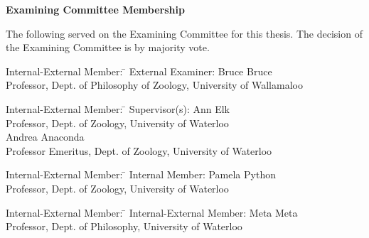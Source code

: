 \documentclass[letterpaper,12pt,titlepage,oneside,final]{book}
\let\origdoublepage\cleardoublepage
\newcommand{\clearemptydoublepage}{%
  \clearpage{\pagestyle{empty}\origdoublepage}}
\let\cleardoublepage\clearemptydoublepage
\begin{document}
\pagestyle{plain}
\setcounter{page}{2}

\cleardoublepage %
 
\begin{center}\textbf{Examining Committee Membership}\end{center}
  \noindent
The following served on the Examining Committee for this thesis. The decision of the Examining Committee is by majority vote.
  \bigskip
  
  \noindent
\begin{tabbing}
Internal-External Member: \=  \kill %
External Examiner: \>  Bruce Bruce \\ 
\> Professor, Dept. of Philosophy of Zoology, University of Wallamaloo \\
\end{tabbing} 
  \bigskip
  
  \noindent
\begin{tabbing}
Internal-External Member: \=  \kill %
Supervisor(s): \> Ann Elk \\
\> Professor, Dept. of Zoology, University of Waterloo \\
\> Andrea Anaconda \\
\> Professor Emeritus, Dept. of Zoology, University of Waterloo \\
\end{tabbing}
  \bigskip
  
  \noindent
  \begin{tabbing}
Internal-External Member: \=  \kill %
Internal Member: \> Pamela Python \\
\> Professor, Dept. of Zoology, University of Waterloo \\
\end{tabbing}
  \bigskip
  
  \noindent
\begin{tabbing}
Internal-External Member: \=  \kill %
Internal-External Member: \> Meta Meta \\
\> Professor, Dept. of Philosophy, University of Waterloo \\
\end{tabbing}
  \bigskip
  
\end{document}
